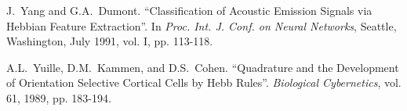 \begin{thebibliography}{999}
J.~Yang and G.A.~Dumont.
``Classification of Acoustic Emission Signals via Hebbian Feature
Extraction''. 
In {\em Proc. Int. J. Conf. on Neural Networks}, Seattle, Washington,
July 1991, vol. I, pp. 113-118.

A.L.~Yuille, D.M.~Kammen, and D.S.~Cohen.
``Quadrature and the Development of Orientation Selective Cortical Cells
by Hebb Rules''.
{\em Biological Cybernetics}, vol. 61, 1989, pp. 183-194.
  
\end{thebibliography}
%

